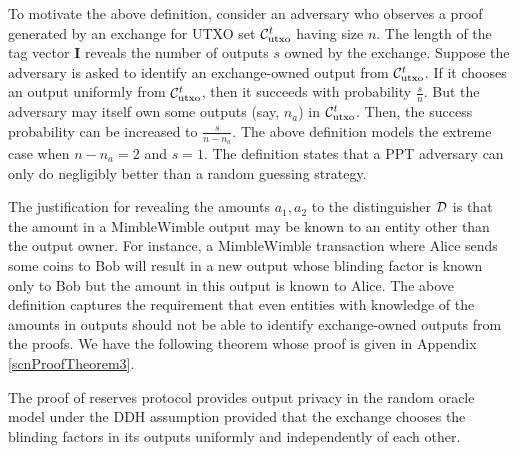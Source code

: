   To motivate the above definition, consider an adversary who observes a \RPlus proof generated by an exchange for UTXO set $\mathcal{C}_{\text{utxo}}^t$ having size $n$. 
  The length of the tag vector $\textbf{I}$ reveals the number of outputs $s$ owned by the exchange. 
  Suppose the adversary is asked to identify an exchange-owned output from $\mathcal{C}_{\text{utxo}}^t$. 
  If it chooses an output uniformly from $\mathcal{C}_{\text{utxo}}^t$, then it succeeds with probability $\frac{s}{n}$. But the adversary may itself own some outputs (say, $n_a$) in $\mathcal{C}_\text{utxo}^t$.
  Then, the success probability can be increased to $\frac{s}{n-n_a}$. The above definition models the extreme case when $n-n_a = 2$ and $s=1$. The definition states that a \textsf{PPT} adversary can only do negligibly better than a random guessing strategy.
  
  The justification for revealing the amounts $a_1, a_2$ to the distinguisher $\mathcal{D}$ is that the amount in a MimbleWimble output may be known to an entity other than the output owner. For instance, a MimbleWimble transaction where Alice sends some coins to Bob will result in a new output whose blinding factor is known only to Bob but the amount in this output is known to Alice.
  The above definition captures the requirement that even entities with knowledge of the amounts in outputs should not be able to identify exchange-owned outputs from the \RPlus proofs. We have the following theorem whose proof is given in Appendix \ref{scnProofTheorem3}.
  \begin{theorem}
  The \RPlus proof of reserves protocol provides output privacy in the random oracle model under the DDH assumption provided that the exchange chooses the blinding factors in its outputs uniformly and independently of each other.
  \label{label:thm3}
  \end{theorem}


